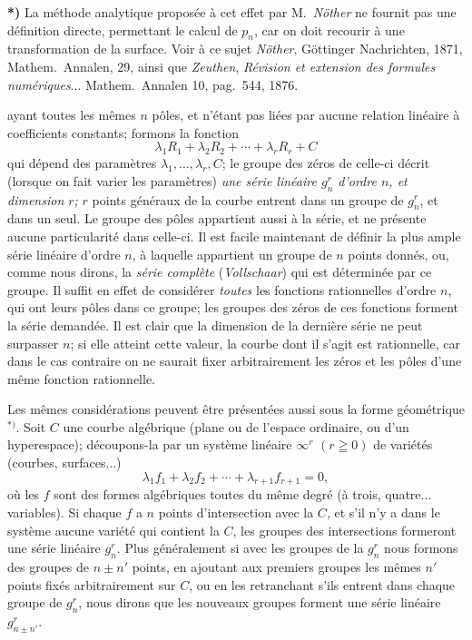 \documentclass{article}
\begin{document}
\textbf{*)} La méthode analytique proposée à cet effet par M.\ \emph{Nöther} ne fournit pas une définition directe, permettant le calcul de $p_{n}$, car on doit recourir à une transformation de la surface. Voir à ce sujet \emph{Nöther}, Göttinger Nachrichten, 1871, Mathem.\ Annalen, 29, ainsi que \emph{Zeuthen}, \emph{Révision et extension des formules numériques}... Mathem.\ Annalen 10, pag.\ 544, 1876.

ayant toutes les mêmes $n$ pôles, et n'étant pas liées par aucune relation linéaire à coefficients constants; formons la fonction
\[ \lambda_{1} R_{1} + \lambda_{2} R_{2} + \cdots + \lambda_{r} R_{r} + C \]
qui dépend des paramètres $\lambda_{1}, \ldots , \lambda_{r}, C$; le groupe des zéros de celle-ci décrit (lorsque on fait varier les paramètres) \emph{une série linéaire $g_{n}^{r}$ d'ordre $n$, et dimension $r$;} $r$ points généraux de la courbe entrent dans un groupe de $g_{n}^{r}$, et dans un seul. Le groupe des pôles appartient aussi à la série, et ne présente aucune particularité dans celle-ci. Il est facile maintenant de définir la plus ample série linéaire d'ordre $n$, à laquelle appartient un groupe de $n$ points donnés, ou, comme nous dirons, la \emph{série complète} (\emph{Vollschaar}) qui est déterminée par ce groupe. Il suffit en effet de considérer \emph{toutes} les fonctions rationnelles d'ordre $n$, qui ont leurs pôles dans ce groupe; les groupes des zéros de ces fonctions forment la série demandée. Il est clair que la dimension de la dernière série ne peut surpasser $n$; si elle atteint cette valeur, la courbe dont il s'agit est rationnelle, car dans le cas contraire on ne saurait fixer arbitrairement les zéros et les pôles d'une même fonction rationnelle.

Les mêmes considérations peuvent être présentées aussi sous la forme géométrique${}^{*)}$. Soit $C$ une courbe algébrique (plane ou de l'espace ordinaire, ou d'un hyperespace); découpons-la par un système linéaire $\infty^{r}$ $(r \geqq 0)$ de variétés (courbes, surfaces...)
\[ \lambda_{1} f_{1} + \lambda_{2} f_{2} + \cdots + \lambda_{r+1} f_{r+1} = 0, \]
où les $f$ sont des formes algébriques toutes du même degré (à trois, quatre... variables). Si chaque $f$ a $n$ points d'intersection avec la $C$, et s'il n'y a dans le système aucune variété qui contient la $C$, les groupes des intersections formeront une série linéaire $g_{n}^{r}$. Plus généralement si avec les groupes de la $g_{n}^{r}$ nous formons des groupes de $n \pm n'$ points, en ajoutant aux premiers groupes les mêmes $n'$ points fixés arbitrairement sur $C$, ou en les retranchant s'ils entrent dans chaque groupe de $g_{n}^{r}$, nous dirons que les nouveaux groupes forment une série linéaire $g_{n \pm n'}^{r}$.
\end{document}
